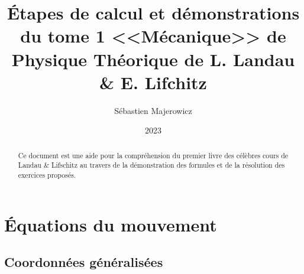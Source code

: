 \documentclass[12pt,a4paper]{memoir} %
\title{\'Etapes de calcul et d\'emonstrations du tome 1 <<M\'ecanique>>  de Physique Th\'eorique de L. Landau \&  E. Lifchitz}
\author{S\'ebastien Majerowicz}
\date{2023} %
\begin{document}
\maketitle

\begin{abstract}
Ce document est une aide pour la compr\'ehension du premier livre des célèbres cours de Landau \& Lifschitz au travers de la démonstration des formules et de la résolution des exercices propos\'es.
\end{abstract}

\tableofcontents*

\clearpage
{}
\setcounter{page}{1}

\chapter{\'Equations du mouvement}
\section{Coordonn\'ees g\'en\'eralis\'ees}
\end{document}
